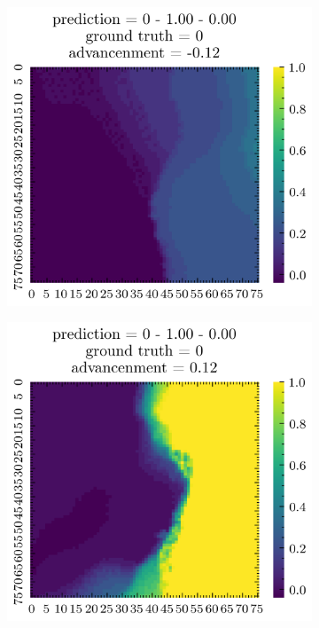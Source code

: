\documentclass[../document.tex]{subfiles}
\begin{document}
\begin{figure}[H]
    \centering
    \begin{subfigure}[b]{0.19\textwidth}
        \includegraphics[width=\linewidth]{../img/5/quarry/worst/patch-2d-0.png}
    \end{subfigure}
    \begin{subfigure}[b]{0.19\textwidth}
        \includegraphics[width=\linewidth]{../img/5/quarry/worst/patch-2d-1.png}

\end{subfigure}
\end{figure}
\end{document}
